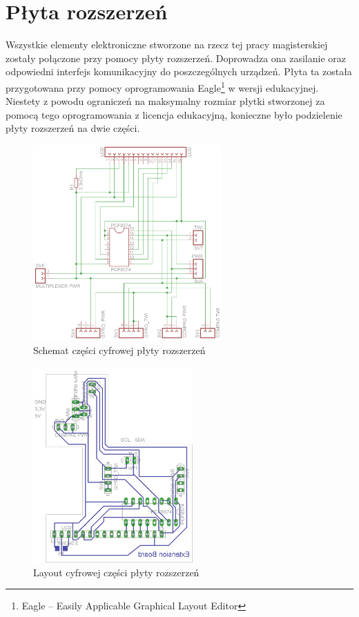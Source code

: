 \section{Płyta rozszerzeń}
\label{ch:ExpanderChapter}
Wszystkie elementy elektroniczne stworzone na rzecz tej pracy magisterskiej
zostały połączone przy pomocy płyty rozszerzeń. Doprowadza ona zasilanie oraz
odpowiedni interfejs komunikacyjny do poszczególnych urządzeń. Płyta ta została
przygotowana przy pomocy oprogramowania Eagle\footnote{Eagle -- Easily Applicable
Graphical Layout Editor} w wersji edukacyjnej. Niestety z powodu ograniczeń na
maksymalny rozmiar płytki stworzonej za pomocą tego oprogramowania z licencja
edukacyjną, konieczne było podzielenie płyty rozszerzeń na dwie części.

\begin{figure}[!ht]
 \centering
 \includegraphics[height=75mm]{../images/ch04/extension_board-sch.png}
 \caption{Schemat części cyfrowej płyty rozszerzeń}
 \label{fig:ExtBoardSch}
\end{figure}

\begin{figure}[!ht]
 \centering
 \includegraphics[height=75mm]{../images/ch04/extension_board.png}
 \caption{Layout cyfrowej części płyty rozszerzeń}
 \label{fig:ExtBoardPCB}
\end{figure}


